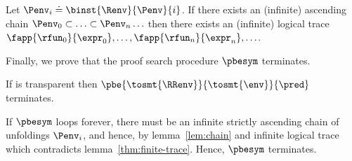 \begin{lemma}  \label{lem:chain}
Let $\Penv_i \doteq \binst{\Renv}{\Penv}{i}$.
If there exists an (infinite) ascending chain
$\Penv_0 \subset \ldots \subset \Penv_n \ldots$
then there exists an (infinite) logical trace
$\fapp{\rfun_0}{\expr_0},\ldots,\fapp{\rfun_n}{\expr_n},\ldots$.
\end{lemma}

%
Finally, we prove that the proof search
procedure $\pbesym$ terminates.

\begin{theorem} \label{thm:termination}
  If  \env is transparent
  then $\pbe{\tosmt{\RRenv}}{\tosmt{\env}}{\pred}$ terminates.
\end{theorem}

If $\pbesym$ loops forever,
there must be an infinite
strictly ascending chain of
unfoldings $\Penv_i$, and
hence, by lemma~\ref{lem:chain}
and infinite logical trace
which contradicts
lemma~\ref{thm:finite-trace}.
%
Hence, $\pbesym$ terminates.
